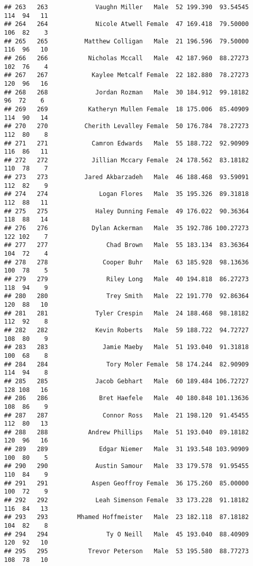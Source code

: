 \documentclass[
]{article}
\begin{document}
\begin{verbatim}
## 263   263             Vaughn Miller   Male  52 199.390  93.54545 114  94   11
## 264   264             Nicole Atwell Female  47 169.418  79.50000 106  82    3
## 265   265          Matthew Colligan   Male  21 196.596  79.50000 116  96   10
## 266   266           Nicholas Mccall   Male  42 187.960  88.27273 102  76    4
## 267   267            Kaylee Metcalf Female  22 182.880  78.27273 120  96   16
## 268   268             Jordan Rozman   Male  30 184.912  99.18182  96  72    6
## 269   269           Katheryn Mullen Female  18 175.006  85.40909 114  90   14
## 270   270          Cherith Levalley Female  50 176.784  78.27273 112  80    8
## 271   271            Camron Edwards   Male  55 188.722  92.90909 116  86   11
## 272   272            Jillian Mccary Female  24 178.562  83.18182 110  78    7
## 273   273          Jared Akbarzadeh   Male  46 188.468  93.59091 112  82    9
## 274   274              Logan Flores   Male  35 195.326  89.31818 112  88   11
## 275   275             Haley Dunning Female  49 176.022  90.36364 118  88   14
## 276   276            Dylan Ackerman   Male  35 192.786 100.27273 122 102    7
## 277   277                Chad Brown   Male  55 183.134  83.36364 104  72    4
## 278   278               Cooper Buhr   Male  63 185.928  98.13636 100  78    5
## 279   279                Riley Long   Male  40 194.818  86.27273 118  94    9
## 280   280                Trey Smith   Male  22 191.770  92.86364 120  88   10
## 281   281             Tyler Crespin   Male  24 188.468  98.18182 112  92    8
## 282   282             Kevin Roberts   Male  59 188.722  94.72727 108  80    9
## 283   283               Jamie Maeby   Male  51 193.040  91.31818 100  68    8
## 284   284                Tory Moler Female  58 174.244  82.90909 114  94    8
## 285   285             Jacob Gebhart   Male  60 189.484 106.72727 128 108   16
## 286   286              Bret Haefele   Male  40 180.848 101.13636 108  86    9
## 287   287               Connor Ross   Male  21 198.120  91.45455 112  80   13
## 288   288           Andrew Phillips   Male  51 193.040  89.18182 120  96   16
## 289   289              Edgar Niemer   Male  31 193.548 103.90909 100  80    5
## 290   290             Austin Samour   Male  33 179.578  91.95455 110  84    9
## 291   291            Aspen Geoffroy Female  36 175.260  85.00000 100  72    9
## 292   292             Leah Simenson Female  33 173.228  91.18182 116  84   13
## 293   293        Mhamed Hoffmeister   Male  23 182.118  87.18182 104  82    8
## 294   294                Ty O Neill   Male  45 193.040  88.40909 120  92   10
## 295   295           Trevor Peterson   Male  53 195.580  88.77273 108  78   10

\end{verbatim}
\end{document}
